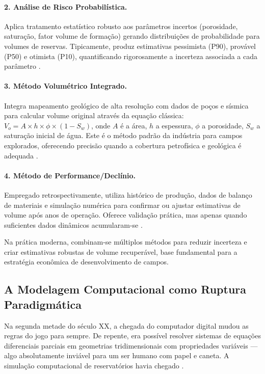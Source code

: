 \documentclass[
  12pt,
  a4paper,
  oneside,
  brazilian,
  sumario=tradicional
]{abntex2}
\begin{document}
\paragraph{2. Análise de Risco Probabilística.}
Aplica tratamento estatístico robusto aos parâmetros incertos (porosidade,
saturação, fator volume de formação) gerando distribuições de
probabilidade para volumes de reservas. Tipicamente, produz estimativas
pessimista (P90), provável (P50) e otimista (P10), quantificando
rigorosamente a incerteza associada a cada parâmetro \cite{ahmed2010}.

\paragraph{3. Método Volumétrico Integrado.}
Integra mapeamento geológico de alta resolução com dados de poços e
sísmica para calcular volume original através da equação clássica:
$V_o = A \times h \times \phi \times (1-S_w)$, onde $A$ é a área, $h$
a espessura, $\phi$ a porosidade, $S_w$ a saturação inicial de água.
Este é o método padrão da indústria para campos explorados, oferecendo
precisão quando a cobertura petrofísica e geológica é adequada \cite{rosa2006}.

\paragraph{4. Método de Performance/Declínio.}
Empregado retrospectivamente, utiliza histórico de produção, dados de
balanço de materiais e simulação numérica para confirmar ou ajustar
estimativas de volume após anos de operação. Oferece validação prática,
mas apenas quando suficientes dados dinâmicos acumularam-se \cite{ahmed2010}.

Na prática moderna, combinam-se múltiplos métodos para reduzir incerteza
e criar estimativas robustas de volume recuperável, base fundamental
para a estratégia econômica de desenvolvimento de campos.

\subsection{A Modelagem Computacional como Ruptura Paradigmática}

Na segunda metade do século XX, a chegada do computador digital mudou
as regras do jogo para sempre. De repente, era possível resolver
sistemas de equações diferenciais parciais em geometrias
tridimensionais com propriedades variáveis — algo absolutamente
inviável para um ser humano com papel e caneta. A simulação
computacional de reservatórios havia chegado \cite{aziz1979, peaceman1977}.
\end{document}
